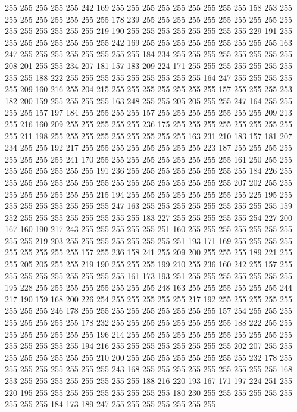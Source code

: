255 255 255 255 255 242 169 255 255 255 255 255 255 255 255 255 158 253 255 255
255 255 255 255 255 255 178 239 255 255 255 255 255 255 255 255 255 255 255 255
255 255 255 255 219 190 255 255 255 255 255 255 255 255 229 191 255 255 255 255
255 255 255 255 242 169 255 255 255 255 255 255 255 255 255 163 247 255 255 255
255 255 255 255 255 184 234 255 255 255 255 255 255 255 255 208 201 255 255 234
207 181 157 183 209 224 171 255 255 255 255 255 255 255 255 255 188 222 255 255
255 255 255 255 255 255 255 164 247 255 255 255 255 255 209 160 216 255 204 215
255 255 255 255 255 255 255 157 255 255 255 253 182 200 159 255 255 255 255 163
248 255 255 205 205 255 255 247 164 255 255 255 255 157 197 184 255 255 255 255
157 255 255 255 255 255 255 255 209 213 255 216 160 209 255 255 255 255 255 236
175 255 255 255 255 255 255 255 255 255 211 198 255 255 255 255 255 255 255 255
255 163 231 210 183 157 181 207 234 255 255 192 217 255 255 255 255 255 255 255
255 223 187 255 255 255 255 255 255 255 255 241 170 255 255 255 255 255 255 255
255 255 161 250 255 255 255 255 255 255 255 255 191 236 255 255 255 255 255 255
255 255 184 226 255 255 255 255 255 255 255 255 255 255 255 255 255 255 255 255
207 202 255 255 255 255 255 255 255 255 215 194 255 255 255 255 255 255 255 255
225 195 255 255 255 255 255 255 255 255 247 163 255 255 255 255 255 255 255 255
255 159 252 255 255 255 255 255 255 255 255 183 227 255 255 255 255 255 254 227
200 167 160 190 217 243 255 255 255 255 255 251 160 255 255 255 255 255 255 255
255 255 219 203 255 255 255 255 255 255 255 251 193 171 169 255 255 255 255 255
255 255 255 255 157 255 236 158 241 255 209 200 255 255 255 189 221 255 255 205
205 255 255 219 190 255 255 255 199 210 255 236 160 242 255 157 255 255 255 255
255 255 255 255 255 161 173 193 251 255 255 255 255 255 255 255 195 228 255 255
255 255 255 255 255 255 248 163 255 255 255 255 255 255 244 217 190 159 168 200
226 254 255 255 255 255 255 217 192 255 255 255 255 255 255 255 255 246 178 255
255 255 255 255 255 255 255 255 157 254 255 255 255 255 255 255 255 255 178 232
255 255 255 255 255 255 255 255 188 222 255 255 255 255 255 255 255 255 196 214
255 255 255 255 255 255 255 255 255 255 255 255 255 255 255 255 194 216 255 255
255 255 255 255 255 255 202 207 255 255 255 255 255 255 255 255 210 200 255 255
255 255 255 255 255 255 232 178 255 255 255 255 255 255 255 255 243 168 255 255
255 255 255 255 255 255 255 168 253 255 255 255 255 255 255 255 255 188 216 220
193 167 171 197 224 251 255 220 195 255 255 255 255 255 255 255 255 255 180 230
255 255 255 255 255 255 255 255 255 184 173 189 247 255 255 255 255 255 255 255
